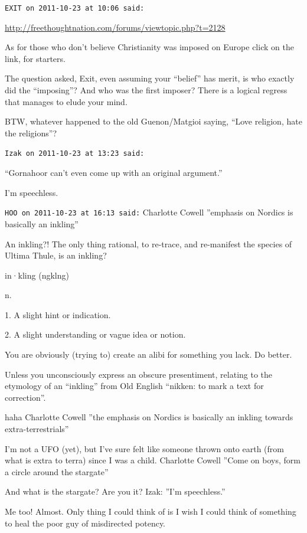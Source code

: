 \begin{footnotesize}
\begin{sffamily}
\hfill

\texttt{EXIT on 2011-10-23 at 10:06 said:}

\url{http://freethoughtnation.com/forums/viewtopic.php?t=2128}


As for those who don't believe Christianity was imposed on Europe click on the link, for starters. 

The question asked, Exit, even assuming your ``belief'' has merit, is who exactly did the ``imposing''? And who was the first imposer? There is a logical regress that manages to elude your mind.

BTW, whatever happened to the old Guenon/Matgioi saying, ``Love religion, hate the religions''?

\hfill

\texttt{Izak on 2011-10-23 at 13:23 said:}

``Gornahoor can't even come up with an original argument.''

I'm speechless.

\hfill

\texttt{HOO on 2011-10-23 at 16:13 said:} Charlotte Cowell ''emphasis on Nordics is basically an inkling''

An inkling?! The only thing rational, to re-trace, and re-manifest the species of Ultima Thule, is an inkling?

in·kling (ngklng)

n.

1. A slight hint or indication.

2. A slight understanding or vague idea or notion.

You are obviously (trying to) create an alibi for something you lack. Do better.

Unless you unconsciously express an obscure presentiment, relating to the etymology of an ``inkling'' from Old English ``nikken: to mark a text for correction''.

haha Charlotte Cowell ''the emphasis on Nordics is basically an inkling towards extra-terrestrials''

I'm not a UFO (yet), but I've sure felt like someone thrown onto earth (from what is extra to terra) since I was a child. Charlotte Cowell ''Come on boys, form a circle around the stargate''

And what is the stargate? Are you it? Izak: ''I'm speechless.''

Me too! Almost. Only thing I could think of is I wish I could think of something to heal the poor guy of misdirected potency.


\end{sffamily}
\end{footnotesize}
